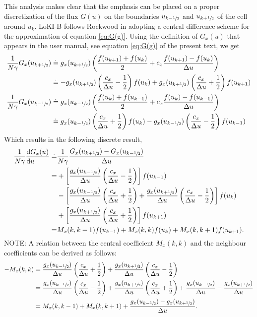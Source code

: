 \documentclass{book}
\newcommand{\frachalf}{\ensuremath{\sfrac{1}{2}}}
\newcommand{\phalf}[1]{\ensuremath{{#1}+\frachalf}}
\newcommand{\mhalf}[1]{\ensuremath{{#1}-\frachalf}}
\begin{document}
This analysis makes clear that the emphasis can be placed on a proper discretization
of the flux $G(u)$ on the boundaries $u_{\mhalf{k}}$ and $u_{\phalf{k}}$ of the cell
around $u_k$. LoKI-B follows Rockwood in adopting a central difference scheme for
the approximation of equation \eqref{eq:G(g)}. Using the definition of $G_x(u)$
that appears in the user manual, see equation \ref{eq:G(g)} of the present text,
we get
\begin{align}
  \frac{1}{N\gamma}G_x(u_{\phalf{k}})
    &\doteq g_x(u_{\phalf{k}})\left(\frac{f(u_{k+1})+f(u_k)}{2}+c_x\frac{f(u_{k+1})-f(u_k)}{\Delta u}\right) \nonumber \\
    &\doteq
      -g_x(u_{\phalf{k}})\left(\frac{c_x}{\Delta u}-\frac{1}{2}\right)f(u_k)
      +
      g_x(u_{\phalf{k}})\left(\frac{c_x}{\Delta u}+\frac{1}{2}\right)f(u_{k+1})
  \\
  \frac{1}{N\gamma}G_x(u_{\mhalf{k}})
    &\doteq g_x(u_{\mhalf{k}})\left(\frac{f(u_{k})+f(u_{k-1})}{2}+c_x\frac{f(u_{k})-f(u_{k-1})}{\Delta u}\right) \nonumber \\
    &\doteq
      g_x(u_{\mhalf{k}})\left(\frac{c_x}{\Delta u}+\frac{1}{2}\right)f(u_k)
      -
      g_x(u_{\mhalf{k}})\left(\frac{c_x}{\Delta u}-\frac{1}{2}\right)f(u_{k-1})
\end{align}
Which results in the following discrete result,
\begin{align}
  \frac{1}{N\gamma}\DERIV{G_x(u)}{u}
  \doteq& \frac{1}{N\gamma}\frac{G_x(u_{\phalf{k}}) - G_x(u_{\mhalf{k}})}{\Delta u} \nonumber \\
       =& +\left[\frac{g_x(u_{\mhalf{k}})}{\Delta u}\left(\frac{c_x}{\Delta u}-\frac{1}{2}\right)\right]f(u_{k-1}) \nonumber \\
        & -\left[
              \frac{g_x(u_{\mhalf{k}})}{\Delta u}\left(\frac{c_x}{\Delta u}+\frac{1}{2}\right)
            + \frac{g_x(u_{\phalf{k}})}{\Delta u}\left(\frac{c_x}{\Delta u}-\frac{1}{2}\right)
           \right] f(u_k) \nonumber \\
        & +\left[\frac{g_x(u_{\phalf{k}})}{\Delta u}\left(\frac{c_x}{\Delta u}+\frac{1}{2}\right)\right]f(u_{k+1}) \nonumber \\
       =& M_x(k,k-1)f(u_{k-1}) + M_x(k,k)f(u_k) + M_x(k,k+1)f(u_{k+1}).
	\label{eq:-dGdu/Ngamma-discrete}
\end{align}
NOTE: A relation between the central coefficient $M_x(k,k)$ and the neighbour
coefficients can be derived as follows:
\begin{align}
  -M_x(k,k)
    &=
    \frac{g_x(u_{\mhalf{k}})}{\Delta u}\left(\frac{c_x}{\Delta u}+\frac{1}{2}\right)
    +
    \frac{g_x(u_{\phalf{k}})}{\Delta u}\left(\frac{c_x}{\Delta u}-\frac{1}{2}\right) \nonumber \\
    &=
    \frac{g_x(u_{\mhalf{k}})}{\Delta u}\left(\frac{c_x}{\Delta u}-\frac{1}{2}\right)
    +
    \frac{g_x(u_{\phalf{k}})}{\Delta u}\left(\frac{c_x}{\Delta u}+\frac{1}{2}\right)
    + \frac{g_x(u_{\mhalf{k}})}{\Delta u} - \frac{g_x(u_{\phalf{k}})}{\Delta u} \nonumber \\
    &=
    M_x(k,k-1)
    +
    M_x(k,k+1)
    + \frac{g_x(u_{\mhalf{k}}) - g_x(u_{\phalf{k}})}{\Delta u}.
\end{align}
\end{document}
